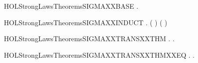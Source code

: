 \newcommand{\HOLStrongLawsTheoremsPREFXXISXXPREFIX}{\UseVerbatim{HOLStrongLawsTheoremsPREFXXISXXPREFIX}}
\begin{SaveVerbatim}{HOLStrongLawsTheoremsSIGMAXXBASE}
\HOLTokenTurnstile{} \HOLSymConst{\HOLTokenForall{}}.    \HOLSymConst{=}  
\end{SaveVerbatim}
\newcommand{\HOLStrongLawsTheoremsSIGMAXXBASE}{\UseVerbatim{HOLStrongLawsTheoremsSIGMAXXBASE}}
\begin{SaveVerbatim}{HOLStrongLawsTheoremsSIGMAXXINDUCT}
\HOLTokenTurnstile{} \HOLSymConst{\HOLTokenForall{}} .   ( ) \HOLSymConst{=}    \HOLSymConst{+}  ( )
\end{SaveVerbatim}
\newcommand{\HOLStrongLawsTheoremsSIGMAXXINDUCT}{\UseVerbatim{HOLStrongLawsTheoremsSIGMAXXINDUCT}}
\begin{SaveVerbatim}{HOLStrongLawsTheoremsSIGMAXXTRANSXXTHM}
\HOLTokenTurnstile{} \HOLSymConst{\HOLTokenForall{}}   .    \HOLTokenTransBegin{}\HOLTokenTransEnd {} \HOLSymConst{\HOLTokenImp{}} \HOLSymConst{\HOLTokenExists{}}.  \HOLSymConst{\HOLTokenLeq{}}  \HOLSymConst{\HOLTokenConj{}}   \HOLTokenTransBegin{}\HOLTokenTransEnd {}
\end{SaveVerbatim}
\newcommand{\HOLStrongLawsTheoremsSIGMAXXTRANSXXTHM}{\UseVerbatim{HOLStrongLawsTheoremsSIGMAXXTRANSXXTHM}}
\begin{SaveVerbatim}{HOLStrongLawsTheoremsSIGMAXXTRANSXXTHMXXEQ}
\HOLTokenTurnstile{} \HOLSymConst{\HOLTokenForall{}}   .    \HOLTokenTransBegin{}\HOLTokenTransEnd {} \HOLSymConst{\HOLTokenEquiv{}} \HOLSymConst{\HOLTokenExists{}}.  \HOLSymConst{\HOLTokenLeq{}}  \HOLSymConst{\HOLTokenConj{}}   \HOLTokenTransBegin{}\HOLTokenTransEnd {}
\end{SaveVerbatim}
\newcommand{\HOLStrongLawsTheoremsSIGMAXXTRANSXXTHMXXEQ}{\UseVerbatim{HOLStrongLawsTheoremsSIGMAXXTRANSXXTHMXXEQ}}

